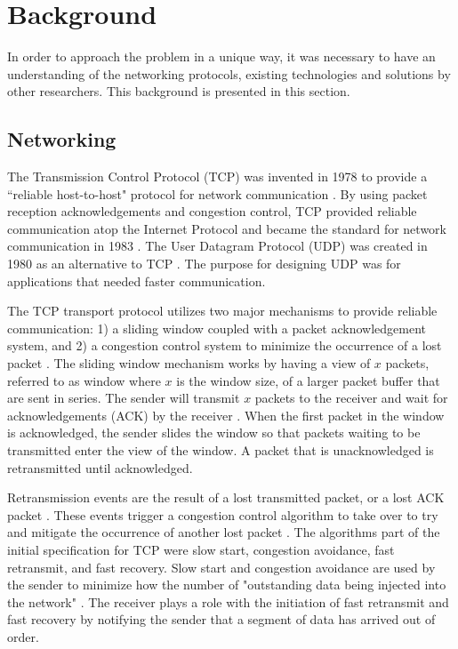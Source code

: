 \chapter{Background}

In order to approach the problem in a unique way, it was necessary to have an understanding of the networking protocols, existing technologies and solutions by other researchers. This background is presented in this section.

\section{Networking}

The Transmission Control Protocol (TCP) was invented in 1978 to provide a ``reliable host-to-host" protocol for network communication \cite{cerf1978specification}. By using packet reception acknowledgements and congestion control, TCP provided reliable communication atop the Internet Protocol and became the standard for network communication in 1983 \cite{andrews2013who}. The User Datagram Protocol (UDP) was created in 1980 as an alternative to TCP \cite{postel1980user}\cite{kozierokr2005udp}. The purpose for designing UDP was for applications that needed faster communication.

The TCP transport protocol utilizes two major mechanisms to provide reliable communication: 1) a sliding window coupled with a packet acknowledgement system, and 2) a congestion control system to minimize the occurrence of a lost packet \cite{cerf1978specification}. The sliding window mechanism works by having a view of $x$ packets, referred to as window where $x$ is the window size, of a larger packet buffer that are sent in series. The sender will transmit $x$ packets to the receiver and wait for acknowledgements (ACK) by the receiver \cite{cerf1978specification}. When the first packet in the window is acknowledged, the sender slides the window so that packets waiting to be transmitted enter the view of the window. A packet that is unacknowledged is retransmitted until acknowledged.

Retransmission events are the result of a lost transmitted packet, or a lost ACK packet \cite{cerf1978specification}. These events trigger a congestion control algorithm to take over to try and mitigate the occurrence of another lost packet \cite{allman2009tcp}. The algorithms part of the initial specification for TCP were slow start, congestion avoidance, fast retransmit, and fast recovery. Slow start and congestion avoidance are used by the sender to minimize how the number of "outstanding data being injected into the network" \cite{allman2009tcp}. The receiver plays a role with the initiation of fast retransmit and fast recovery by notifying the sender that a segment of data has arrived out of order.

